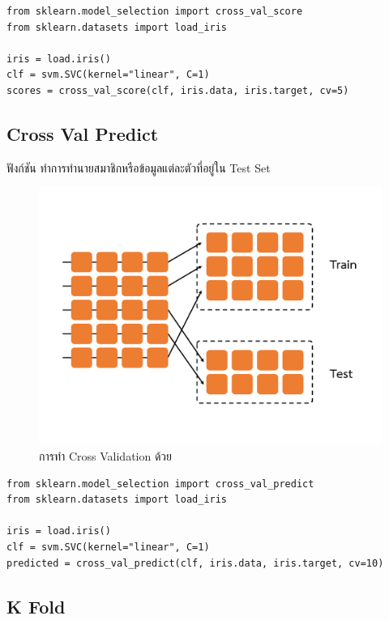 \begin{lstlisting}[style=MyPython]
from sklearn.model_selection import cross_val_score
from sklearn.datasets import load_iris

iris = load.iris()
clf = svm.SVC(kernel="linear", C=1)
scores = cross_val_score(clf, iris.data, iris.target, cv=5)
\end{lstlisting}

\subsection{Cross Val Predict}
\label{ssec:cross_val_predict}

ฟังก์ชัน  ทำการทำนายสมาชิกหรือข้อมูลแต่ละตัวที่อยู่ใน Test Set

\begin{figure}[H]
    \centering
    \includegraphics[width=0.9\linewidth,page=3]{fig/cross_validation.pdf}
    \caption{การทำ Cross Validation ด้วย }
    \label{fig:cross_val_predict}
\end{figure}

\begin{lstlisting}[style=MyPython]
from sklearn.model_selection import cross_val_predict
from sklearn.datasets import load_iris

iris = load.iris()
clf = svm.SVC(kernel="linear", C=1)
predicted = cross_val_predict(clf, iris.data, iris.target, cv=10)
\end{lstlisting}

\subsection{K Fold}
\label{ssec:f_fold}

